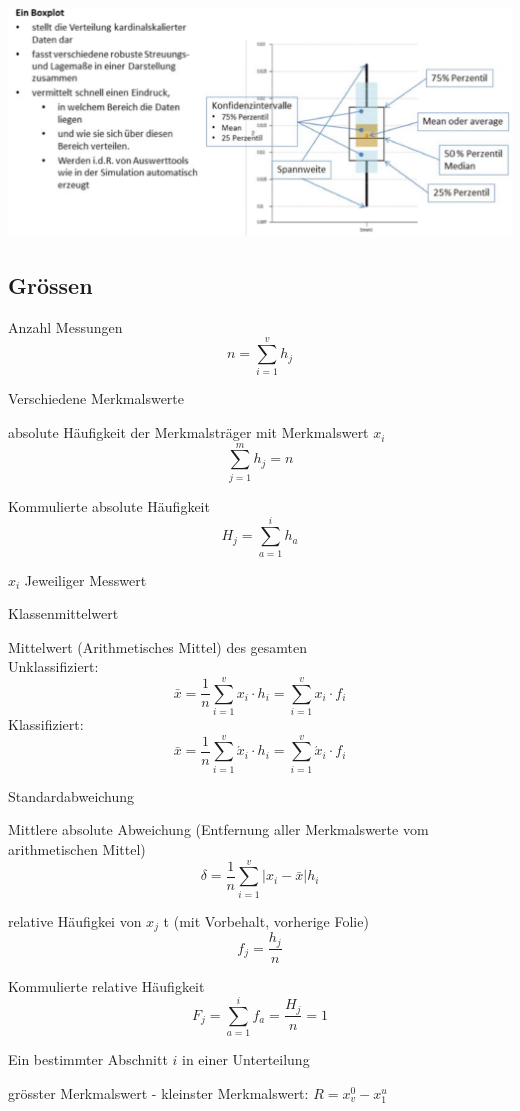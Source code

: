 \includegraphics[scale=0.5]{img/boxplot.png}


\subsection{Grössen}

\begin{description}
	\item[$n$]		Anzahl Messungen
	\[
		n = \sum^v_{i=1}{h_j}
	\]
	\item[$v$]		Verschiedene Merkmalswerte
	\item[$h_j$] absolute Häufigkeit der Merkmalsträger mit Merkmalswert $x_i$ \hfill \\
		\[
			\sum^{m}_{j=1}{h_j} = n
		\]
	\item[$H_j$]		Kommulierte absolute Häufigkeit
		\[
			H_j = \sum^i_{a=1}{h_a}
		\]
	\item{$x_i$}		Jeweiliger Messwert
	\item[$\acute{x}_j$] Klassenmittelwert
	\item[$\bar{x}$]	Mittelwert (Arithmetisches Mittel) des gesamten \hfill \\
		Unklassifiziert:
		\[
			\bar{x} = \frac1n \sum^v_{i=1}{x_i \cdot h_i} = \sum^v_{i=1}{x_i \cdot f_i}
		\]
		Klassifiziert:
		\[
		\bar{x} = \frac1n \sum^v_{i=1}{\acute{x}_i \cdot h_i} = \sum^v_{i=1}{\acute{x}_i \cdot f_i}
		\]
		
	\item[$\sigma$]		Standardabweichung
	\item[$\delta$]		Mittlere absolute Abweichung (Entfernung aller Merkmalswerte vom arithmetischen Mittel)
		\[
			\delta = \frac1n \sum^v_{i=1}{\left|x_i - \bar{x}\right|h_i}
		\]
	\item[$f_j$]		relative Häufigkei von $x_j$ t (mit Vorbehalt, vorherige Folie) \hfill \\
		\[
			f_j = \frac{h_j}n
		\]
	\item[$F_j$]		Kommulierte relative Häufigkeit
		\[
			F_j = \sum^i_{a=1}{f_a} = \frac{H_j}n = 1
		\]
	\item[$Q_i$]		Ein bestimmter Abschnitt $i$ in einer Unterteilung
	\item[$R$]			grösster Merkmalswert - kleinster Merkmalswert: $R = x_v^0 - x_1^u$
\end{description}

